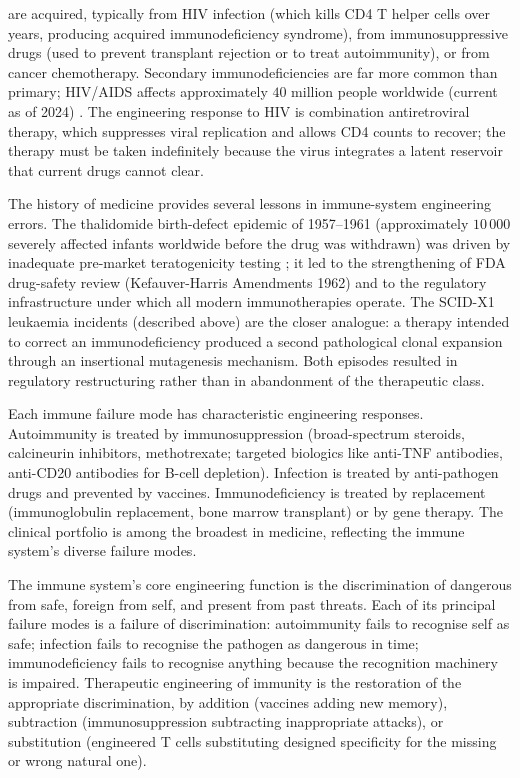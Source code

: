  are acquired, typically from
HIV infection (which kills CD4 T helper cells over years, producing
acquired immunodeficiency syndrome), from immunosuppressive drugs
(used to prevent transplant rejection or to treat autoimmunity), or
from cancer chemotherapy. Secondary immunodeficiencies are far more
common than primary; HIV/AIDS affects approximately $40$ million
people worldwide (current as of 2024)
\cite{paper:v6c07-fauci-2008}. The engineering response to HIV is
combination antiretroviral therapy, which suppresses viral
replication and allows CD4 counts to recover; the therapy must be
taken indefinitely because the virus integrates a latent reservoir
that current drugs cannot clear.

 The history of medicine
provides several lessons in immune-system engineering errors. The
thalidomide birth-defect epidemic of 1957--1961 (approximately
$10\,000$ severely affected infants worldwide before the drug was
withdrawn) was driven by inadequate pre-market teratogenicity testing
\cite{paper:v6c07-stephens-thalidomide-2000}; it led to the
strengthening of FDA drug-safety review (Kefauver-Harris Amendments
1962) and to the regulatory infrastructure under which all modern
immunotherapies operate. The SCID-X1 leukaemia incidents (described
above) are the closer analogue: a therapy intended to correct an
immunodeficiency produced a second pathological clonal expansion
through an insertional mutagenesis mechanism. Both episodes resulted
in regulatory restructuring rather than in abandonment of the
therapeutic class.

 Each immune failure
mode has characteristic engineering responses. Autoimmunity is
treated by immunosuppression (broad-spectrum steroids, calcineurin
inhibitors, methotrexate; targeted biologics like anti-TNF antibodies,
anti-CD20 antibodies for B-cell depletion). Infection is treated by
anti-pathogen drugs and prevented by vaccines. Immunodeficiency is
treated by replacement (immunoglobulin replacement, bone marrow
transplant) or by gene therapy. The clinical portfolio is among the
broadest in medicine, reflecting the immune system's diverse failure
modes.

\begin{principle}
The immune system's core engineering function is the discrimination
of dangerous from safe, foreign from self, and present from past
threats. Each of its principal failure modes is a failure of
discrimination: autoimmunity fails to recognise self as safe;
infection fails to recognise the pathogen as dangerous in time;
immunodeficiency fails to recognise anything because the recognition
machinery is impaired. Therapeutic engineering of immunity is the
restoration of the appropriate discrimination, by addition (vaccines
adding new memory), subtraction (immunosuppression subtracting
inappropriate attacks), or substitution (engineered T cells
substituting designed specificity for the missing or wrong natural
one).
\end{principle}

